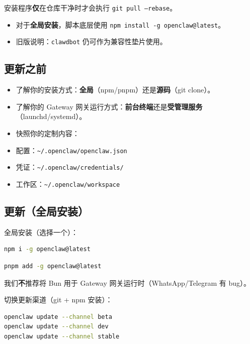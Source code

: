 安装程序\textbf{仅}在仓库干净时才会执行 \texttt{git pull --rebase}。
\begin{itemize}
  \item 对于\textbf{全局安装}，脚本底层使用 \texttt{npm install -g openclaw@latest}。
  \item 旧版说明：\texttt{clawdbot} 仍可作为兼容性垫片使用。
\end{itemize}


\subsection{更新之前}


\begin{itemize}
  \item 了解你的安装方式：\textbf{全局}（npm/pnpm）还是\textbf{源码}（git clone）。
  \item 了解你的 Gateway 网关运行方式：\textbf{前台终端}还是\textbf{受管理服务}（launchd/systemd）。
  \item 快照你的定制内容：
  \item 配置：\texttt{\textasciitilde{}/.openclaw/openclaw.json}
  \item 凭证：\texttt{\textasciitilde{}/.openclaw/credentials/}
  \item 工作区：\texttt{\textasciitilde{}/.openclaw/workspace}
\end{itemize}


\subsection{更新（全局安装）}


全局安装（选择一个）：

\begin{lstlisting}[language=bash]
npm i -g openclaw@latest
\end{lstlisting}


\begin{lstlisting}[language=bash]
pnpm add -g openclaw@latest
\end{lstlisting}


我们\textbf{不}推荐将 Bun 用于 Gateway 网关运行时（WhatsApp/Telegram 有 bug）。

切换更新渠道（git + npm 安装）：

\begin{lstlisting}[language=bash]
openclaw update --channel beta
openclaw update --channel dev
openclaw update --channel stable
\end{lstlisting}


